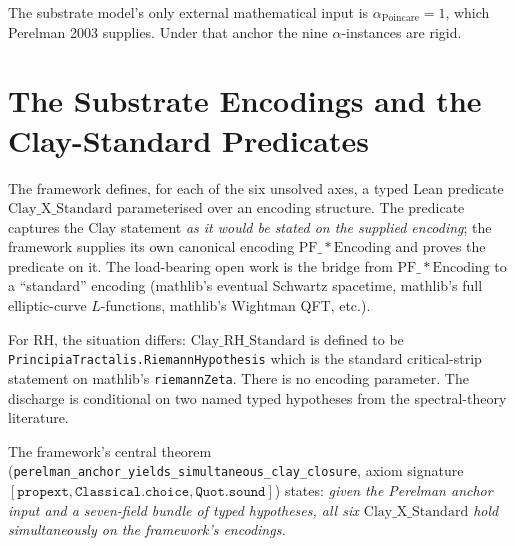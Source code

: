 \documentclass[11pt,a4paper]{article}
\theoremstyle{plain}
\theoremstyle{definition}
\theoremstyle{remark}
\newcommand{\aPo}{\alpha_{\mathrm{Poincare}}}
\newcommand{\Cstd}[1]{\mathrm{Clay\_#1\_Standard}}
\newcommand{\code}[1]{\texttt{#1}}
\begin{document}
\noindent The substrate model's only external mathematical input is
$\aPo = 1$, which Perelman 2003 supplies. Under that anchor the
nine $\alpha$-instances are rigid.

\section{The Substrate Encodings and the Clay-Standard Predicates}
\label{sec:per-axis}

The framework defines, for each of the six unsolved axes, a
typed Lean predicate $\Cstd{X}$ parameterised over an
encoding structure. The predicate captures the Clay statement
\emph{as it would be stated on the supplied encoding}; the
framework supplies its own canonical encoding
$\mathrm{PF\_*Encoding}$ and proves the predicate on it. The
load-bearing open work is the bridge from
$\mathrm{PF\_*Encoding}$ to a ``standard'' encoding (mathlib's
eventual Schwartz spacetime, mathlib's full elliptic-curve
$L$-functions, mathlib's Wightman QFT, etc.).

For RH, the situation differs: $\Cstd{RH}$ is defined
to be \code{PrincipiaTractalis.RiemannHypothesis} which is the
standard critical-strip statement on mathlib's \code{riemannZeta}.
There is no encoding parameter. The discharge is conditional on
two named typed hypotheses from the spectral-theory literature.

The framework's central theorem
(\code{perelman\_anchor\_yields\_simultaneous\_clay\_closure},
axiom signature $[\code{propext}, \code{Classical.choice}, \code{Quot.sound}]$)
states: \emph{given the Perelman anchor input and a seven-field
bundle of typed hypotheses, all six $\Cstd{X}$ hold
simultaneously on the framework's encodings.}
\end{document}

